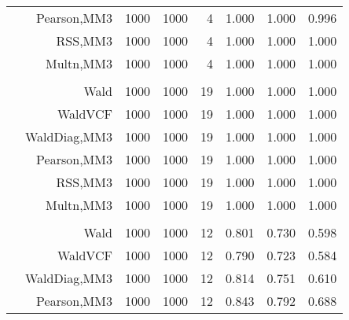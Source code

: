 \documentclass[
]{article}
\begin{document}
\begin{table}[H]
{\begin{tabular}[t]{lrrrrrrr}
\hspace{1em} & Pearson,MM3 & 1000 & 1000 & 4 & 1.000 & 1.000 & 0.996\\

\hspace{1em} & RSS,MM3 & 1000 & 1000 & 4 & 1.000 & 1.000 & 1.000\\

\hspace{1em} & Multn,MM3 & 1000 & 1000 & 4 & 1.000 & 1.000 & 1.000\\
\cmidrule{1-8}
\addlinespace[0.3em]
\multicolumn{8}{l}{\textbf{1F 15V}}\\
\hspace{1em} & Wald & 1000 & 1000 & 19 & 1.000 & 1.000 & 1.000\\

\hspace{1em} & WaldVCF & 1000 & 1000 & 19 & 1.000 & 1.000 & 1.000\\

\hspace{1em} & WaldDiag,MM3 & 1000 & 1000 & 19 & 1.000 & 1.000 & 1.000\\

\hspace{1em} & Pearson,MM3 & 1000 & 1000 & 19 & 1.000 & 1.000 & 1.000\\

\hspace{1em} & RSS,MM3 & 1000 & 1000 & 19 & 1.000 & 1.000 & 1.000\\

\hspace{1em} & Multn,MM3 & 1000 & 1000 & 19 & 1.000 & 1.000 & 1.000\\
\cmidrule{1-8}
\addlinespace[0.3em]
\multicolumn{8}{l}{\textbf{2F 10V}}\\
\hspace{1em} & Wald & 1000 & 1000 & 12 & 0.801 & 0.730 & 0.598\\

\hspace{1em} & WaldVCF & 1000 & 1000 & 12 & 0.790 & 0.723 & 0.584\\

\hspace{1em} & WaldDiag,MM3 & 1000 & 1000 & 12 & 0.814 & 0.751 & 0.610\\

\hspace{1em} & Pearson,MM3 & 1000 & 1000 & 12 & 0.843 & 0.792 & 0.688\\


\end{tabular}}
\end{table}
\end{document}
